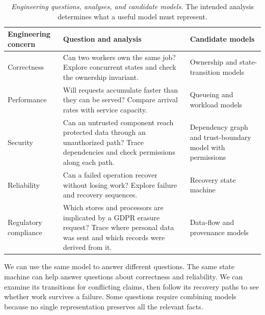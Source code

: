 {\footnotesize
\begin{longtable}[]{@{}
  >{\raggedright\arraybackslash}p{}
  >{\raggedright\arraybackslash}p{}
  >{\raggedright\arraybackslash}p{}@{}}
\caption[Engineering questions, analyses, and candidate models]{\emph{Engineering questions, analyses, and candidate models.} The intended analysis determines what a useful model must represent.}\label{engineering-questions-and-candidate-models}\tabularnewline
\toprule\noalign{}
Engineering concern & Question and analysis & Candidate models \\
\midrule\noalign{}
\endhead
\bottomrule\noalign{}
\endlastfoot
Correctness & Can two workers own the same job? Explore concurrent states and check the ownership invariant. & Ownership and state-transition models \\
Performance & Will requests accumulate faster than they can be served? Compare arrival rates with service capacity. & Queueing and workload models \\
Security & Can an untrusted component reach protected data through an unauthorized path? Trace dependencies and check permissions along each path. & Dependency graph and trust-boundary model with permissions \\
Reliability & Can a failed operation recover without losing work? Explore failure and recovery sequences. & Recovery state machine \\
Regulatory compliance & Which stores and processors are implicated by a GDPR erasure request? Trace where personal data was sent and which records were derived from it. & Data-flow and provenance models \\
\end{longtable}
}

We can use the same model to answer different questions. The same state machine can help answer questions about correctness and reliability. We can examine its transitions for conflicting claims, then follow its recovery paths to see whether work survives a failure. Some questions require combining models because no single representation preserves all the relevant facts.





